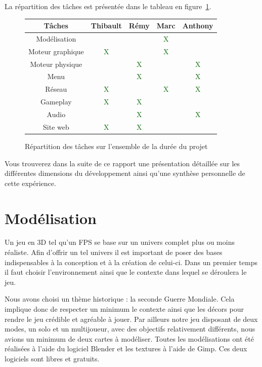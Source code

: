 \documentclass[11pt]{report}
\begin{document}
La répartition des tâches est présentée dans le tableau en figure~\ref{tab}.


\begin{figure}[htbp]
\centering
\begin{tabular}{ | c || c | c | c | c | }
\hline Tâches & Thibault & Rémy & Marc & Anthony \\
\hline Modélisation & & & \textcolor{darkgreen}{X} & \\
\hline Moteur graphique & \textcolor{darkgreen}{X} & & \textcolor{darkgreen}{X} & \\
\hline Moteur physique & & \textcolor{darkgreen}{X} & & \textcolor{darkgreen}{X} \\
\hline Menu & & \textcolor{darkgreen}{X} & & \textcolor{darkgreen}{X} \\
\hline Réseau & \textcolor{darkgreen}{X} & & \textcolor{darkgreen}{X} & \textcolor{darkgreen}{X} \\
\hline Gameplay & \textcolor{darkgreen}{X} & \textcolor{darkgreen}{X} & & \\
\hline Audio & & \textcolor{darkgreen}{X} & & \textcolor{darkgreen}{X} \\
\hline Site web & \textcolor{darkgreen}{X} & \textcolor{darkgreen}{X} & & \\
\hline
\end{tabular}
\caption{Répartition des tâches sur l'ensemble de la durée du projet}
\label{tab}
\end{figure}

Vous trouverez dans la suite de ce rapport une présentation détaillée sur les différentes dimensions du développement ainsi qu'une synthèse personnelle de cette expérience.

\chapter{Modélisation}

Un jeu en 3D tel qu'un FPS se base sur un univers complet plus ou moins réaliste. Afin d'offrir un tel univers il est important de poser des bases indispensables à la conception et à la création de celui-ci. Dans un premier temps il faut choisir l’environnement ainsi que le contexte dans lequel se déroulera le jeu.

Nous avons choisi un thème historique : la seconde Guerre Mondiale. Cela implique donc de respecter un minimum le contexte ainsi que les décors pour rendre le jeu crédible et agréable à jouer. Par ailleurs notre jeu disposant de deux modes, un solo et un multijoueur, avec des objectifs relativement différents, nous avions un minimum de deux cartes à modéliser.  Toutes les modélisations ont été réalisées à l’aide du logiciel Blender et les textures à l’aide de Gimp.  Ces deux logiciels sont libres et gratuits.
\end{document}
